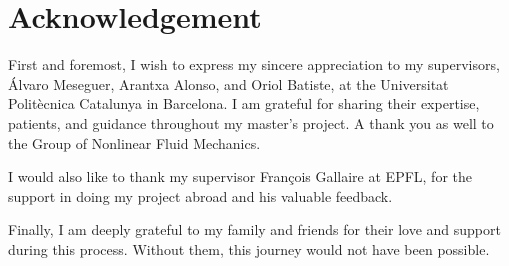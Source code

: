 
\section*{Acknowledgement}

First and foremost, I wish to express my sincere appreciation to my
supervisors, Álvaro Meseguer, Arantxa Alonso, and Oriol Batiste, at the
Universitat Politècnica Catalunya in Barcelona. I am grateful for sharing their
expertise, patients, and guidance throughout my master's project. A thank you
as well to the Group of Nonlinear Fluid Mechanics.

I would also like to thank my supervisor François Gallaire at EPFL, for the
support in doing my project abroad and his valuable feedback.

Finally, I am deeply grateful to my family and friends for their love and
support during this process. Without them, this journey would not have been
possible.
